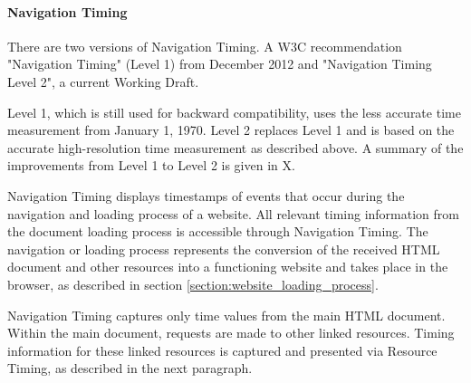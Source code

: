 





\paragraph{Navigation Timing} %


There are two versions of Navigation Timing.
A W3C recommendation "Navigation Timing" (Level 1) from December 2012 %
and "Navigation Timing Level 2", a current Working Draft. %

Level 1, which is still used for backward compatibility, uses the less accurate time measurement from January 1, 1970.
Level 2 replaces Level 1 and is based on the accurate high-resolution time measurement as described above.
A summary of the improvements from Level 1 to Level 2 is given in X. %




Navigation Timing displays timestamps of events that occur during the navigation and loading process of a website.
All relevant timing information from the document loading process is accessible through Navigation Timing.
The navigation or loading process represents the conversion of the received HTML document and other resources into a functioning website and takes place in the browser, as described in section \ref{section:website_loading_process}. %

Navigation Timing captures only time values from the main HTML document.
Within the main document, requests are made to other linked resources.
Timing information for these linked resources is captured and presented via Resource Timing, as described in the next paragraph. %

